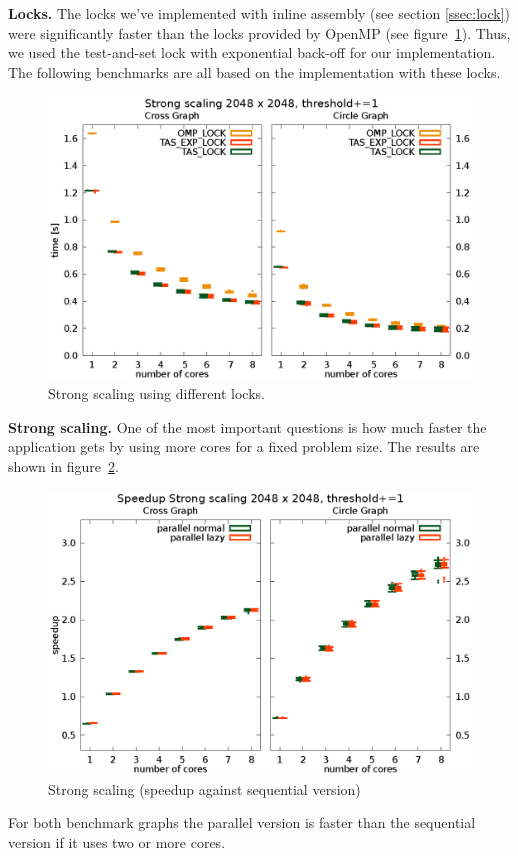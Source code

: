 \documentclass[letterpaper]{article}
\newcommand{\mypar}[1]{{\bf #1.}}
\begin{document}
\mypar{Locks}
The locks we've implemented with inline assembly (see section \ref{ssec:lock}) were significantly faster than the locks provided by OpenMP (see figure~\ref{fig:lock_bench}). Thus, we used the test-and-set lock with exponential back-off for our implementation. The following benchmarks are all based on the implementation with these locks.

\begin{figure}[h]\centering
  \includegraphics[scale=0.558]{lock_benchmark.eps}
  \caption{Strong scaling using different locks.\label{fig:lock_bench}}
\end{figure}


\mypar{Strong scaling}
One of the most important questions is how much faster the application gets by using more cores for a fixed problem size. The results are shown in figure~\ref{fig:strong_scaling}.
\begin{figure}[h]\centering
  \includegraphics[scale=0.558]{strong_scaling_speedup.eps}
  \caption{Strong scaling (speedup against sequential version) \label{fig:strong_scaling}}
\end{figure}
For both benchmark graphs the parallel version is faster than the sequential version if it uses two or more cores.
\end{document}
